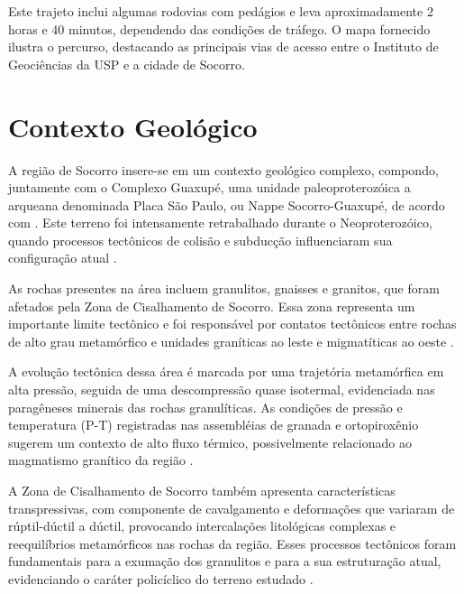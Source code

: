 \par{Este trajeto inclui algumas rodovias com pedágios e leva aproximadamente 2 horas e 40 minutos, dependendo das condições de tráfego. O mapa fornecido ilustra o percurso, destacando as principais vias de acesso entre o Instituto de Geociências da USP e a cidade de Socorro.}

\section{Contexto Geológico}

\par{A região de Socorro insere-se em um contexto geológico complexo, compondo, juntamente com o Complexo Guaxupé, uma unidade paleoproterozóica a arqueana denominada Placa São Paulo, ou Nappe Socorro-Guaxupé, de acordo com \cite{campos_neto_2004}. Este terreno foi intensamente retrabalhado durante o Neoproterozóico, quando processos tectônicos de colisão e subducção influenciaram sua configuração atual \cite{silva_2005}.}

As rochas presentes na área incluem granulitos, gnaisses e granitos, que foram afetados pela Zona de Cisalhamento de Socorro. Essa zona representa um importante limite tectônico e foi responsável por contatos tectônicos entre rochas de alto grau metamórfico e unidades graníticas ao leste e migmatíticas ao oeste \cite{oliveira_2010}.

A evolução tectônica dessa área é marcada por uma trajetória metamórfica em alta pressão, seguida de uma descompressão quase isotermal, evidenciada nas paragêneses minerais das rochas granulíticas. As condições de pressão e temperatura (P-T) registradas nas assembléias de granada e ortopiroxênio sugerem um contexto de alto fluxo térmico, possivelmente relacionado ao magmatismo granítico da região \cite{souza_2012, juliani_2014}.

A Zona de Cisalhamento de Socorro também apresenta características transpressivas, com componente de cavalgamento e deformações que variaram de rúptil-dúctil a dúctil, provocando intercalações litológicas complexas e reequilíbrios metamórficos nas rochas da região. Esses processos tectônicos foram fundamentais para a exumação dos granulitos e para a sua estruturação atual, evidenciando o caráter policíclico do terreno estudado \cite{freitas_2018}.
